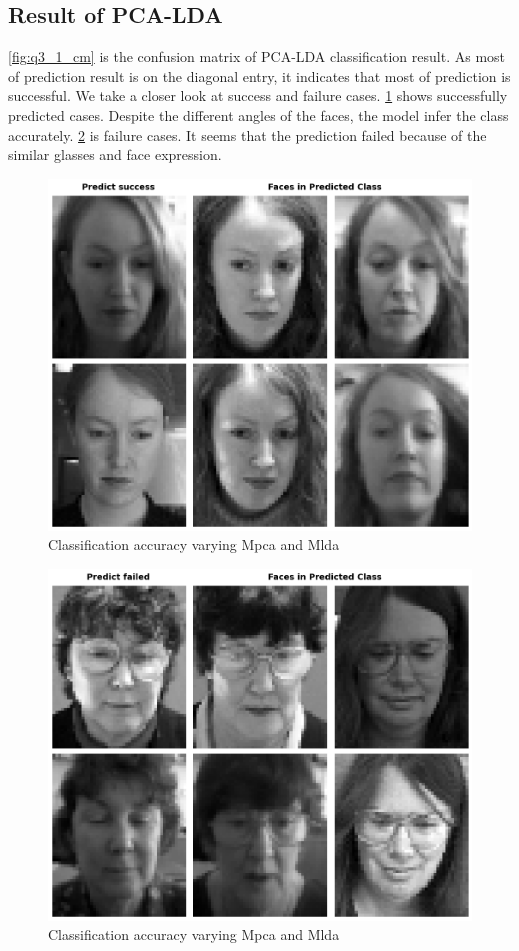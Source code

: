 \subsection{Result of PCA-LDA}

\cref{fig:q3_1_cm} is the confusion matrix of PCA-LDA classification result. As most of prediction result is on the diagonal entry, it indicates that most of prediction is successful. We take a closer look at success and failure cases. \cref{fig:q3_success} shows successfully predicted cases. Despite the different angles of the faces, the model infer the class accurately. \cref{fig:q3_fail} is failure cases. It seems that the prediction failed because of the similar glasses and face expression.

\begin{figure}[t]
  \centering
   \includegraphics[width=0.8\linewidth]{image/q3_success.png}

   \caption{Classification accuracy varying Mpca and Mlda}
   \label{fig:q3_success}
\end{figure}

\begin{figure}[t]
  \centering
   \includegraphics[width=0.8\linewidth]{image/q3_fail.png}

   \caption{Classification accuracy varying Mpca and Mlda}
   \label{fig:q3_fail}
\end{figure}

